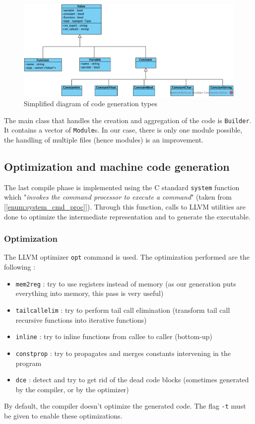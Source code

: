 \documentclass[a4paper,11pt]{article}
\begin{document}
\begin{figure}[h]
	\centering
	\includegraphics[scale=0.8]{Value.png}
	\caption{Simplified diagram of code generation types}
	\label{codegen:value}
\end{figure}

The main class that handles the creation and aggregation of the code is \texttt{Builder}. It contains a vector of \texttt{Module}s. In our case, there is only one module possible, the handling of multiple files (hence modules) is an improvement.
\subsection{Optimization and machine code generation}
The last compile phase is implemented using the C standard \texttt{system} function which "\textit{invokes the command processor to execute a command}" (taken from [\ref{enum:system_cmd_proc}]). Through this function, calls to LLVM utilities are done to optimize the intermediate representation and to generate the executable.
\subsubsection{Optimization}
The LLVM optimizer \texttt{opt} command is used. The optimization performed are the following :
\begin{itemize}
	\item \texttt{mem2reg} : try to use registers instead of memory (as our generation puts everything into memory, this pass is very useful)
	\item \texttt{tailcallelim} : try to perform tail call elimination (transform tail call recursive functions into iterative functions)
	\item \texttt{inline} : try to inline functions from callee to caller (bottom-up)
	\item \texttt{constprop} : try to propagates and merges constants intervening in the program
	\item \texttt{dce} : detect and try to get rid of the dead code blocks (sometimes generated by the compiler, or by the optimizer)
\end{itemize}
By default, the compiler doesn't optimize the generated code. The flag \texttt{-t} must be given to enable these optimizations.
\end{document}
